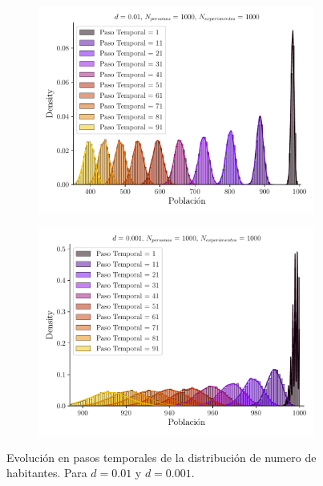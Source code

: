 \documentclass[twocolumn,aps,prl]{revtex4-1}
\begin{document}
\begin{figure}[ht!]
  \centering
  \begin{subfigure}[b]{0.49\linewidth}
      \centering
      \includegraphics[width = 0.999\textwidth]{figuras/ex01-a-evolucion_temporal.pdf}
      \label{fig:figuras/ex01-a-evolucion_temporal}
  \end{subfigure}
  \begin{subfigure}[b]{0.49\linewidth}
      \centering
      \includegraphics[width = 0.999\textwidth]{figuras/ex01-b-evolucion_temporal.pdf}
      \label{fig:figuras/ex01-b-evolucion_temporal}
  \end{subfigure}
  \caption{Evolución en pasos temporales de la distribución de numero de habitantes. Para $d=0.01$ y $d=0.001$. }
  \label{fig:figuras/ex01-evolucion_temporal}
\end{figure}
\end{document}
